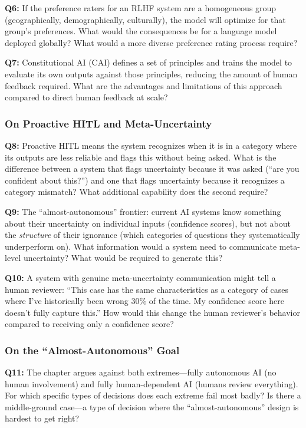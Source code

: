 \textbf{Q6:} If the preference raters for an RLHF system are a homogeneous group (geographically, demographically, culturally), the model will optimize for that group's preferences. What would the consequences be for a language model deployed globally? What would a more diverse preference rating process require?

\textbf{Q7:} Constitutional AI (CAI) defines a set of principles and trains the model to evaluate its own outputs against those principles, reducing the amount of human feedback required. What are the advantages and limitations of this approach compared to direct human feedback at scale?

\subsubsection*{On Proactive HITL and Meta-Uncertainty}

\textbf{Q8:} Proactive HITL means the system recognizes when it is in a category where its outputs are less reliable and flags this without being asked. What is the difference between a system that flags uncertainty because it was asked (``are you confident about this?'') and one that flags uncertainty because it recognizes a category mismatch? What additional capability does the second require?

\textbf{Q9:} The ``almost-autonomous'' frontier: current AI systems know something about their uncertainty on individual inputs (confidence scores), but not about the \emph{structure} of their ignorance (which categories of questions they systematically underperform on). What information would a system need to communicate meta-level uncertainty? What would be required to generate this?

\textbf{Q10:} A system with genuine meta-uncertainty communication might tell a human reviewer: ``This case has the same characteristics as a category of cases where I've historically been wrong 30\% of the time. My confidence score here doesn't fully capture this.'' How would this change the human reviewer's behavior compared to receiving only a confidence score?

\subsubsection*{On the ``Almost-Autonomous'' Goal}

\textbf{Q11:} The chapter argues against both extremes---fully autonomous AI (no human involvement) and fully human-dependent AI (humans review everything). For which specific types of decisions does each extreme fail most badly? Is there a middle-ground case---a type of decision where the ``almost-autonomous'' design is hardest to get right?

